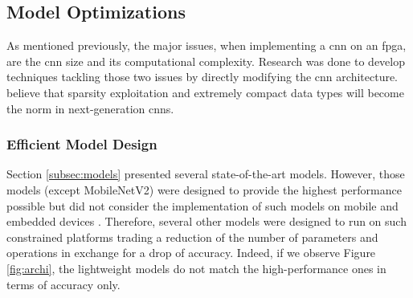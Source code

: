 \subsection{Model Optimizations} \label{subsec:mdopti}
As mentioned previously, the major issues, when implementing a \acrshort{cnn} on an \acrshort{fpga}, are the \acrshort{cnn} size and its computational complexity. Research was done to develop techniques tackling those two issues by directly modifying the \acrshort{cnn} architecture. \textcite{nurvitadhi_can_2017} believe that sparsity exploitation and extremely compact data types will become the norm in next-generation \acrshort{cnn}s.
%
%
\subsubsection{Efficient Model Design}
%
Section \ref{subsec:models} presented several state-of-the-art models. However, those models (except MobileNetV2) were designed to provide the highest performance possible but did not consider the implementation of such models on mobile and embedded devices \cite{iandola_squeezenet_2016}. Therefore, several other models were designed to run on such constrained platforms trading a reduction of the number of parameters and operations in exchange for a drop of accuracy. Indeed, if we observe Figure \ref{fig:archi}, the lightweight models do not match the high-performance ones in terms of accuracy only.

